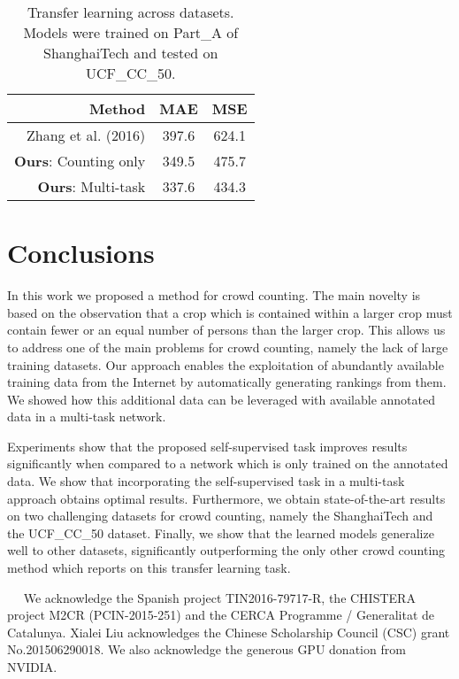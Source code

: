 \documentclass[10pt,twocolumn,letterpaper]{article}
\newcommand{\minisection}[1]{\vspace{0.04in} \noindent {\bf #1}\ \ }
\begin{document}
\begin{table}[tb]
\centering

\begin{tabular}{rcc}
\hline
\textbf{Method} & \textbf{MAE}   & \textbf{MSE}   \\ \hline \hline
Zhang et al. (2016) \cite{zhang2016single}      & 397.6 & 624.1 \\ \hline
\textbf{Ours}: Counting only        & 349.5 & 475.7 \\
\textbf{Ours}: Multi-task   & 337.6 & 434.3 \\ \hline
\end{tabular}
\caption{Transfer learning across datasets. Models were trained on
  Part\_A of ShanghaiTech and tested on UCF\_CC\_50.}
\label{table:transfer}
\end{table}

\section{Conclusions}
In this work we proposed a method for crowd counting. The main novelty
is based on the observation that a crop which is contained within a
larger crop must contain fewer or an equal number of persons than the
larger crop. This allows us to address one of the main problems for
crowd counting, namely the lack of large training datasets. Our
approach enables the exploitation of abundantly available training
data from the Internet by automatically generating rankings from
them. We showed how this additional data can be leveraged with
available annotated data in a multi-task network. 

Experiments show that the proposed self-supervised task improves
results significantly when compared to a network which is only trained
on the annotated data. We show that incorporating the self-supervised
task in a multi-task approach obtains optimal results. Furthermore, we
obtain state-of-the-art results on two challenging datasets for crowd
counting, namely the ShanghaiTech and the UCF\_CC\_50
dataset. Finally, we show that the learned models generalize well to
other datasets, significantly outperforming the only other crowd
counting method which reports on this transfer learning task.

\minisection{Acknowledgements}
We acknowledge  the  Spanish project TIN2016-79717-R, the CHISTERA project M2CR (PCIN-2015-251) and the CERCA Programme / Generalitat de Catalunya. Xialei Liu acknowledges the Chinese Scholarship Council (CSC) grant No.201506290018. We also acknowledge the generous GPU donation from NVIDIA.

\newpage
{\small


}
\end{document}
